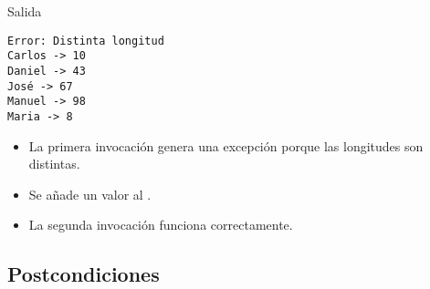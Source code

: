 

\begin{frame}[t,fragile]{Salida}
\begin{lstlisting}[style=terminal]
Error: Distinta longitud
Carlos -> 10
Daniel -> 43
José -> 67
Manuel -> 98
Maria -> 8
\end{lstlisting}
\begin{itemize}
  \item La primera invocación genera una excepción porque las longitudes son distintas.
  \item Se añade un valor al .
  \item La segunda invocación funciona correctamente.
\end{itemize}
\end{frame}


\subsection{Postcondiciones}


